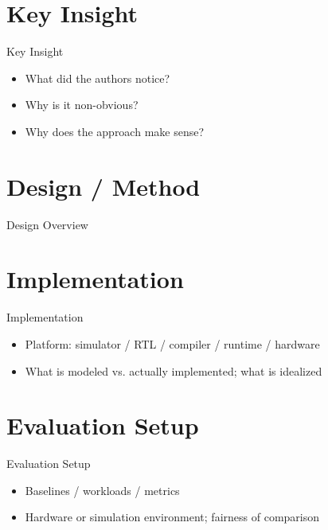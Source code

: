 \documentclass[aspectratio=169]{beamer}
\begin{document}
\section{Key Insight}
\begin{frame}{Key Insight}
  \begin{itemize}
    \item What did the authors notice?
    \item Why is it non-obvious?
    \item Why does the approach make sense?
  \end{itemize}
\end{frame}

\section{Design / Method}
\begin{frame}{Design Overview}
\end{frame}

\section{Implementation}
\begin{frame}{Implementation}
  \begin{itemize}
    \item Platform: simulator / RTL / compiler / runtime / hardware
    \item What is modeled vs. actually implemented; what is idealized
  \end{itemize}
\end{frame}

\section{Evaluation Setup}
\begin{frame}{Evaluation Setup}
  \begin{itemize}
    \item Baselines / workloads / metrics
    \item Hardware or simulation environment; fairness of comparison
  \end{itemize}
\end{frame}
\end{document}
